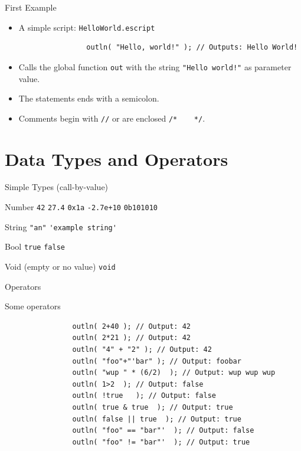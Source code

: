 \documentclass[ucs,9pt]{beamer}
\begin{document}
\begin{frame}[fragile]{First Example}
\begin{itemize}
	\addtolength{\itemsep}{\baselineskip}
	\item A simple script: \lstinline{HelloWorld.escript}
	\small
			\begin{lstlisting}
				outln( "Hello, world!" ); // Outputs: Hello World!
			\end{lstlisting}
	\normalsize
		\item Calls the global function \lstinline!out! with the string  \lstinline{"Hello world!"}  as parameter value.
		\item The statements ends with a semicolon.
		\item Comments begin with  \lstinline{//}  or are enclosed \lstinline{/*    */}.
\end{itemize}
\end{frame}


\section{Data Types and Operators}
\begin{frame}[fragile]{Simple Types (call-by-value)}
	\begin{block}{Number}
		\hfill \lstinline!42! \hfill \lstinline!27.4! \hfill \lstinline!0x1a! \hfill \lstinline!-2.7e+10! \hfill \lstinline!0b101010! \hfill{}
	\end{block}
	\begin{block}{String}
		\hfill \lstinline!"an"! \hfill \lstinline!'example string'!  \hfill{}
	\end{block}
	\begin{block}{Bool}
		\hfill \lstinline!true! \hfill \lstinline!false! \hfill{}
	\end{block}
	\begin{block}{Void (empty or no value)}
		\hfill \lstinline!void! \hfill{}
	\end{block}
\end{frame}

\begin{frame}[fragile]{Operators}
	\begin{block}{Some operators}
				\begin{lstlisting}
				outln( 2+40 ); // Output: 42
				outln( 2*21 ); // Output: 42
				outln( "4" + "2" ); // Output: 42
				outln( "foo"+"'bar" ); // Output: foobar
				outln( "wup " * (6/2)  ); // Output: wup wup wup
				outln( 1>2  ); // Output: false
				outln( !true   ); // Output: false
				outln( true & true  ); // Output: true
				outln( false || true  ); // Output: true
				outln( "foo" == "bar"'  ); // Output: false
				outln( "foo" != "bar"'  ); // Output: true
			\end{lstlisting}
	\end{block}
\end{frame}
	
\end{document}
